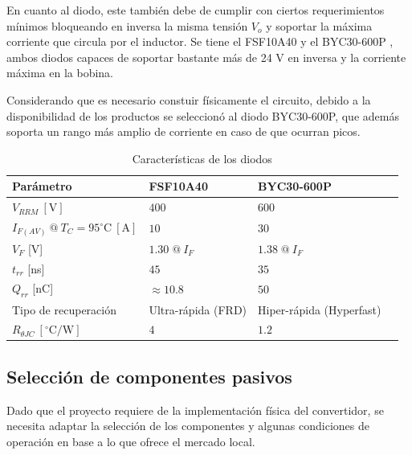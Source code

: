 \documentclass[conference]{IEEEtran}
\begin{document}
En cuanto al diodo, este también debe de cumplir con ciertos requerimientos mínimos bloqueando
en inversa la misma tensión $V_{o}$ y soportar la máxima corriente que circula por el inductor. 
Se tiene el FSF10A40 \cite{FSF10A40_Datasheet} y el BYC30-600P \cite{BYC30-600P_NXP}, ambos diodos 
capaces de soportar bastante más de 24 V en inversa y la corriente máxima en la bobina. 

Considerando que es necesario constuir físicamente el circuito, debido a la disponibilidad de los productos 
se seleccionó al diodo BYC30-600P, que además soporta un rango más amplio de corriente en caso de que ocurran
picos.

\begin{table}[H]
    \centering
    \renewcommand{\arraystretch}{1.5}
    \begin{tabularx}{\columnwidth}{
        >{\hsize=1.3\hsize}X 
        >{\hsize=0.70\hsize}X 
        >{\hsize=0.75\hsize}X 
        >{\hsize=0.75\hsize}X
    }
        \toprule
        Parámetro                                        & FSF10A40 & BYC30-600P \\
        \midrule
        $V_{RRM}~\mathrm{[V]}$                           & $400$  & $600$ \\
        $I_{F(AV)}~@~T_C=95^\circ\mathrm{C}~\mathrm{[A]}$ & $10$ & $30$ \\
        $V_F$ [V] & $1.30 \;@\:I_F$ & $1.38\;@\:I_F$ \\
        $t_{rr}$ [ns]                                    & $45$   & $35$ \\
        $Q_{rr}$ [nC]                                    & $\approx 10.8$ & $50$ \\
        Tipo de recuperación                             & Ultra-rápida (FRD) & Hiper-rápida (Hyperfast)\\
        $R_{\theta JC}~[^\circ\mathrm{C/W}]$             & $4$    & $1.2$\\
        \bottomrule
    \end{tabularx}
    \caption{Características de los diodos}
    \label{tab:diodo_comparison}
\end{table}

\subsection{Selección de componentes pasivos}
Dado que el proyecto requiere de la implementación física del convertidor, se necesita adaptar la selección
de los componentes y algunas condiciones de operación en base a lo que ofrece el mercado local.
\end{document}
